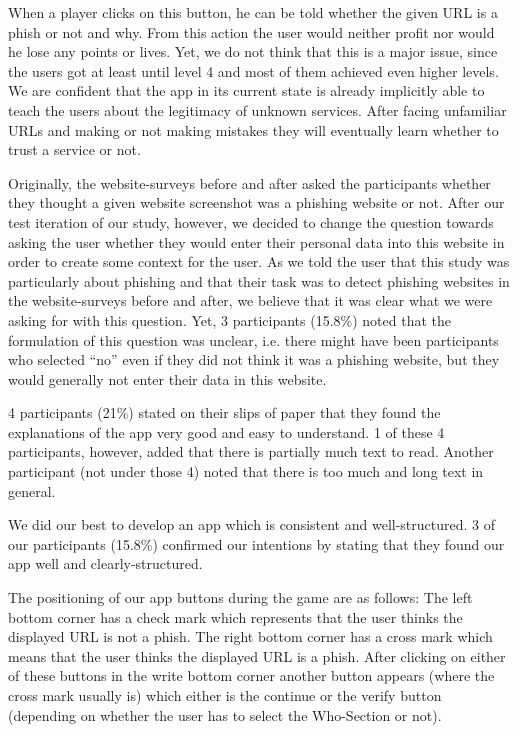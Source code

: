 \begin{description}[leftmargin=0cm]
When a player clicks on this button, he can be told whether the given URL is a phish or not and why.
From this action the user would neither profit nor would he lose any points or lives.
Yet, we do not think that this is a major issue, since the users got at least until level 4 and most of them achieved even higher levels.
We are confident that the app in its current state is already implicitly able to teach the users about the legitimacy of unknown services.
After facing unfamiliar URLs and making or not making mistakes they will eventually learn whether to trust a service or not.
	\item[Question to Data Entry] Originally, the website-surveys before and after asked the participants whether they thought a given website screenshot was a phishing website or not.
After our test iteration of our study, however, we decided to change the question towards asking the user whether they would enter their personal data into this website in order to create some context for the user. 
As we told the user that this study was particularly about phishing and that their task was to detect phishing websites in the website-surveys before and after, we believe that it was clear what we were asking for with this question.
Yet, 3 participants (15.8\%) noted that the formulation of this question was unclear, i.e. there might have been participants who selected ``no'' even if they did not think it was a phishing website, but they would  generally not enter their data in this website.
	\item[Explanations and Comprehensibility]
4 participants (21\%) stated on their slips of paper that they found the explanations of the app very good and easy to understand.
1 of these 4 participants, however, added that there is partially much text to read.
Another participant (not under those 4) noted that there is too much and long text in general.
	\item[App Structure]
We did our best to develop an app which is consistent and well-structured.
3 of our participants (15.8\%) confirmed our intentions by stating that they found our app well and clearly-structured.
	\item[Button Positioning] The positioning of our app buttons during the game are as follows: 
The left bottom corner has a check mark which represents that the user thinks the displayed URL is not a phish.
The right bottom corner has a cross mark which means that the user thinks the displayed URL is a phish.
After clicking on either of these buttons in the write bottom corner another button appears (where the cross mark usually is) which either is the continue or the verify button (depending on whether the user has to select the Who-Section or not).

\end{description}
